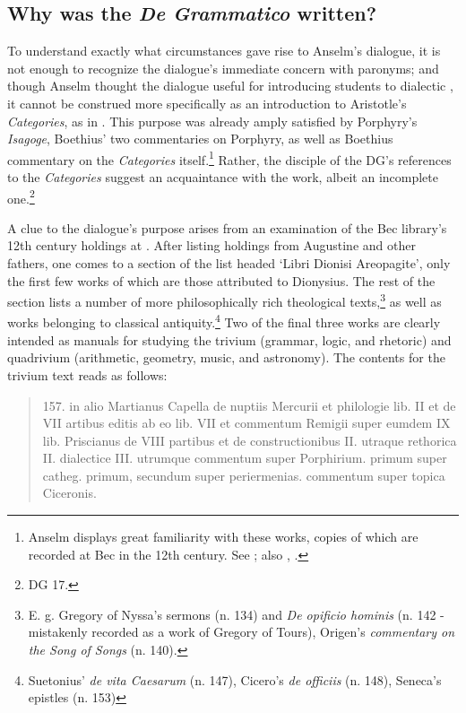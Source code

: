\documentclass[]{article}
\begin{document}
\subsection{Why was the \textit{De Grammatico} written?}
To understand exactly what circumstances gave rise to Anselm's dialogue, it is not enough to recognize the dialogue's immediate concern with paronyms; and though Anselm thought the dialogue useful for introducing students to dialectic \cite[DV, prol.]{AnselmDV}, it cannot be construed more specifically as an introduction to Aristotle's \textit{Categories}, as in \cite{McCordAdams2000}. This purpose was already amply satisfied by Porphyry's \textit{Isagoge}, Boethius' two commentaries on Porphyry, as well as Boethius commentary on the \textit{Categories} itself.\footnote{Anselm displays great familiarity with these works, copies of which are recorded at Bec in the 12th century. See \cite[p. 266]{Bekker1885}; also \cite{Lewry1981}, \cite{Holopainen2007}.} Rather, the disciple of the DG's references to the \textit{Categories} suggest an acquaintance with the work, albeit an incomplete one.\footnote{DG 17.}

A clue to the dialogue's purpose arises from an examination of the Bec library's 12th century holdings at \cite[p. 266]{Bekker1885}. After listing holdings from Augustine and other fathers, one comes to a section of the list headed `Libri Dionisi Areopagite', only the first few works of which are those attributed to Dionysius. The rest of the section lists a number of more philosophically rich theological texts,\footnote{E. g. Gregory of Nyssa's sermons (n. 134) and \textit{De opificio hominis} (n. 142 - mistakenly recorded as a work of Gregory of Tours), Origen's \textit{commentary on the Song of Songs} (n. 140).} as well as works belonging to classical antiquity.\footnote{Suetonius' \textit{de vita Caesarum} (n. 147), Cicero's \textit{de officiis} (n. 148), Seneca's epistles (n. 153)} Two of the final three works are clearly intended as manuals for studying the trivium (grammar, logic, and rhetoric) and quadrivium (arithmetic, geometry, music, and astronomy). The contents for the trivium text reads as follows: 
\begin{quote}
157. in alio Martianus Capella de nuptiis Mercurii et philologie lib. II et de VII artibus editis ab eo lib. VII et commentum Remigii super eumdem IX lib. Priscianus de VIII partibus et de constructionibus II. utraque rethorica II. dialectice III. utrumque commentum super Porphirium. primum super catheg. primum, secundum super periermenias. commentum super topica Ciceronis.
\end{quote}
\end{document}

